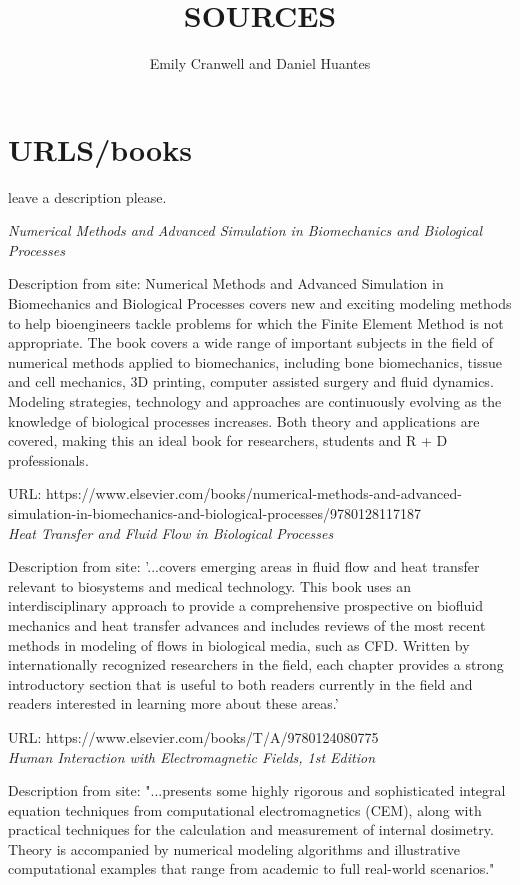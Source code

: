 \documentclass[12pt]{article}
\begin{document}
\title{SOURCES}
\author{Emily Cranwell and Daniel Huantes}
\maketitle
\section{URLS/books}
leave a description please.

\textit{Numerical Methods and Advanced Simulation in Biomechanics and Biological Processes}

Description from site: Numerical Methods and Advanced Simulation in Biomechanics and Biological Processes covers new and exciting modeling methods to help bioengineers tackle problems for which the Finite Element Method is not appropriate. The book covers a wide range of important subjects in the field of numerical methods applied to biomechanics, including bone biomechanics, tissue and cell mechanics, 3D printing, computer assisted surgery and fluid dynamics. Modeling strategies, technology and approaches are continuously evolving as the knowledge of biological processes increases. Both theory and applications are covered, making this an ideal book for researchers, students and R + D professionals.

URL: https://www.elsevier.com/books/numerical-methods-and-advanced-simulation-in-biomechanics-and-biological-processes/9780128117187
\\

\textit{Heat Transfer and Fluid Flow in Biological Processes}

Description from site: '...covers emerging areas in fluid flow and heat transfer relevant to biosystems and medical technology. This book uses an interdisciplinary approach to provide a comprehensive prospective on biofluid mechanics and heat transfer advances and includes reviews of the most recent methods in modeling of flows in biological media, such as CFD. Written by internationally recognized researchers in the field, each chapter provides a strong introductory section that is useful to both readers currently in the field and readers interested in learning more about these areas.'

URL: https://www.elsevier.com/books/T/A/9780124080775
\\

\textit{Human Interaction with Electromagnetic Fields, 1st Edition}

Description from site: "...presents some highly rigorous and sophisticated integral equation techniques from computational electromagnetics (CEM), along with practical techniques for the calculation and measurement of internal dosimetry. Theory is accompanied by numerical modeling algorithms and illustrative computational examples that range from academic to full real-world scenarios."
\end{document}
